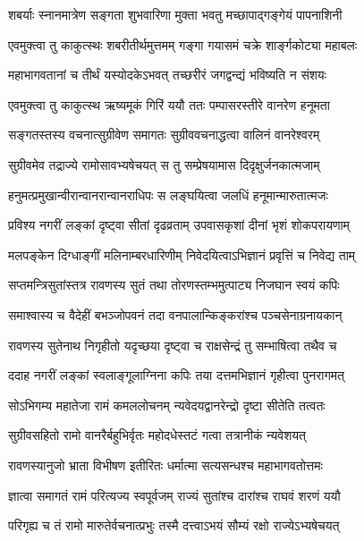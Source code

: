 
\twolineshloka
{शबर्याः स्नानमात्रेण सङ्गता शुभवारिणा}
{मुक्ता भवतु मच्छापाद्गङ्गेयं पापनाशिनी}%

\twolineshloka
{एवमुक्त्वा तु काकुत्स्थः शबरीतीर्थमुत्तमम्}
{गङ्गा गयासमं चक्रे शार्ङ्गकोट्या महाबलः}%

\twolineshloka
{महाभागवतानां च तीर्थं यस्योदकेऽभवत्}
{तच्छरीरं जगद्वन्द्यं भविष्यति न संशयः}%

\twolineshloka
{एवमुक्त्वा तु काकुत्स्थ ऋष्यमूकं गिरिं ययौ}
{ततः पम्पासरस्तीरे वानरेण हनूमता}%

\twolineshloka
{सङ्गतस्तस्य वचनात्सुग्रीवेण समागतः}
{सुग्रीववचनाद्धत्वा वालिनं वानरेश्वरम्}%

\twolineshloka
{सुग्रीवमेव तद्राज्ये रामोसावभ्यषेचयत्}
{स तु सम्प्रेषयामास दिदृक्षुर्जनकात्मजाम्}%

\twolineshloka
{हनुमत्प्रमुखान्वीरान्वानरान्वानराधिपः}
{स लङ्घयित्वा जलधिं हनूमान्मारुतात्मजः}%

\twolineshloka
{प्रविश्य नगरीं लङ्कां दृष्ट्वा सीतां दृढव्रताम्}
{उपवासकृशां दीनां भृशं शोकपरायणाम्}%

\twolineshloka
{मलपङ्केन दिग्धाङ्गीं मलिनाम्बरधारिणीम्}
{निवेदयित्वाऽभिज्ञानं प्रवृत्तिं च निवेद्य ताम्}%

\twolineshloka
{सप्तमन्त्रिसुतांस्तत्र रावणस्य सुतं तथा}
{तोरणस्तम्भमुत्पाट्य निजघान स्वयं कपिः}%

\twolineshloka
{समाश्वास्य च वैदेहीं बभञ्जोपवनं तदा}
{वनपालान्किङ्करांश्च पञ्चसेनाग्रनायकान्}%

\twolineshloka
{रावणस्य सुतेनाथ निगृहीतो यदृच्छया}
{दृष्ट्वा च राक्षसेन्द्रं तु सम्भाषित्वा तथैव च}%

\twolineshloka
{ददाह नगरीं लङ्कां स्वलाङ्गूलाग्निना कपिः}
{तया दत्तमभिज्ञानं गृहीत्वा पुनरागमत्}%

\twolineshloka
{सोऽभिगम्य महातेजा रामं कमललोचनम्}
{न्यवेदयद्वानरेन्द्रो दृष्टा सीतेति तत्वतः}%

\twolineshloka
{सुग्रीवसहितो रामो वानरैर्बहुभिर्वृतः}
{महोदधेस्तटं गत्वा तत्रानीकं न्यवेशयत्}%

\twolineshloka
{रावणस्यानुजो भ्राता विभीषण इतीरितः}
{धर्मात्मा सत्यसन्धश्च महाभागवतोत्तमः}%

\twolineshloka
{ज्ञात्वा समागतं रामं परित्यज्य स्वपूर्वजम्}
{राज्यं सुतांश्च दारांश्च राघवं शरणं ययौ}%

\twolineshloka
{परिगृह्य च तं रामो मारुतेर्वचनात्प्रभुः}
{तस्मै दत्त्वाऽभयं सौम्यं रक्षो राज्येऽभ्यषेचयत्}%

